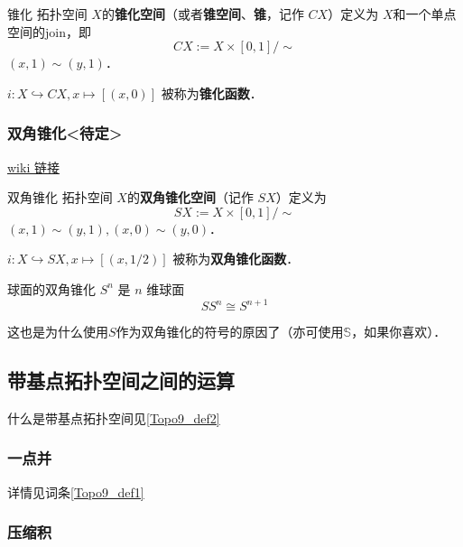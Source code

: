 \begin{definition}{锥化}
拓扑空间 $X$的\textbf{锥化空间}（或者\textbf{锥空间}、\textbf{锥}，记作 $C X$）定义为 $X$和一个单点空间的join，即
\[
    C X := X \times [0,1] / \sim
\]
$(x, 1) \sim (y, 1)$．

$i: X \hookrightarrow C X, x \mapsto [(x, 0)]$ 被称为\textbf{锥化函数}．
\end{definition}


\subsubsection{双角锥化<待定>}

\href{https://en.wikipedia.org/wiki/Suspension_(topology)}{wiki 链接}

\begin{definition}{双角锥化}
拓扑空间 $X$的\textbf{双角锥化空间}（记作 $S X$）定义为
\[
    S X := X \times [0,1] / \sim
\]
$(x, 1) \sim (y, 1), (x, 0) \sim (y, 0)$．

$i: X \hookrightarrow S X, x \mapsto [(x, 1/2)]$ 被称为\textbf{双角锥化函数}．
\end{definition}

\begin{theorem}{球面的双角锥化}
$S^n$ 是 $n$ 维球面
\[
S S^n \cong S^{n+1}
\]
\end{theorem}
这也是为什么使用$S$作为双角锥化的符号的原因了（亦可使用$\mathbb{S}$，如果你喜欢）．


\subsection{带基点拓扑空间之间的运算}

什么是带基点拓扑空间见\autoref{Topo9_def2}~

\subsubsection{一点并}

详情见词条\autoref{Topo9_def1}~


\subsubsection{压缩积}

